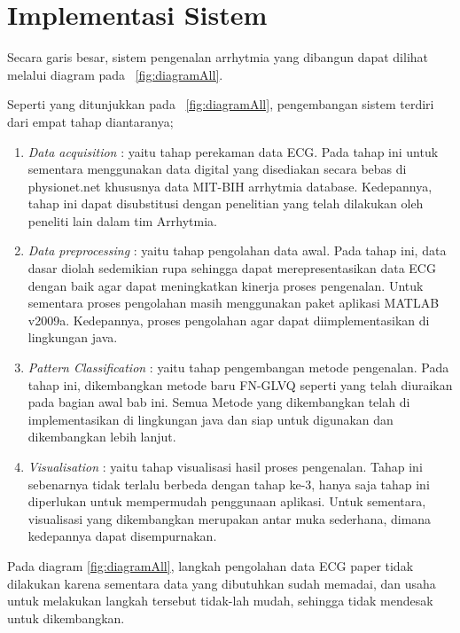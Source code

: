 \clearpage
\section{Implementasi Sistem}
Secara garis besar, sistem pengenalan arrhytmia yang dibangun dapat dilihat
melalui diagram pada \pic~\ref{fig:diagramAll}. 


Seperti yang ditunjukkan pada \pic~\ref{fig:diagramAll}, pengembangan sistem
terdiri dari empat tahap diantaranya;
\begin{enumerate}
  \item \emph{Data acquisition} : yaitu tahap perekaman data ECG. Pada tahap
  ini untuk sementara menggunakan data digital yang disediakan secara bebas di
  physionet.net khususnya data MIT-BIH arrhytmia database. Kedepannya, tahap ini dapat
  disubstitusi dengan penelitian yang telah dilakukan oleh peneliti lain dalam tim Arrhytmia.
  \item \emph{Data preprocessing} : yaitu tahap pengolahan data awal. Pada tahap
  ini, data dasar diolah sedemikian rupa sehingga dapat merepresentasikan data
  ECG dengan baik agar dapat meningkatkan kinerja proses pengenalan. Untuk
  sementara proses pengolahan masih menggunakan paket aplikasi MATLAB v2009a.
  Kedepannya, proses pengolahan agar dapat diimplementasikan di lingkungan java.
  \item \emph{Pattern Classification} : yaitu tahap pengembangan metode
  pengenalan. Pada tahap ini, dikembangkan metode baru FN-GLVQ seperti yang
  telah diuraikan pada bagian awal bab ini. Semua Metode yang dikembangkan telah
  di implementasikan di lingkungan java dan siap untuk digunakan dan
  dikembangkan lebih lanjut.
  \item \emph{Visualisation} : yaitu tahap visualisasi hasil proses pengenalan.
  Tahap ini sebenarnya tidak terlalu berbeda dengan tahap ke-3, hanya saja tahap
  ini diperlukan untuk mempermudah penggunaan aplikasi. Untuk sementara,
  visualisasi yang dikembangkan merupakan antar muka sederhana, dimana
  kedepannya dapat disempurnakan.
\end{enumerate}

Pada diagram \ref{fig:diagramAll}, langkah pengolahan data ECG paper tidak
dilakukan karena sementara data yang dibutuhkan sudah memadai, dan usaha untuk
melakukan langkah tersebut tidak-lah mudah, sehingga tidak  mendesak untuk
dikembangkan.

